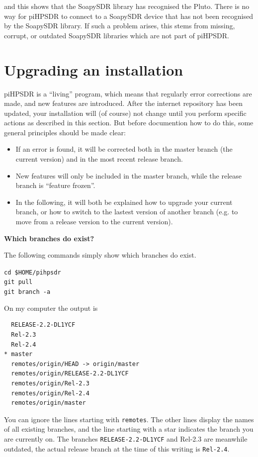 \documentclass[12pt]{book}
\def\grtt#1{\texttt{\color{magenta}#1}}
\def\pH{pi\-HPSDR\xspace}
\begin{document}
and this shows that the SoapySDR library has recognised the Pluto.
There is no way for \pH to connect
to a SoapySDR device that has not been recognised by the SoapySDR library. If such a problem arises, this
stems from missing, corrupt, or outdated SoapySDR libraries which are not part of \pH.

\section{Upgrading an installation}
\pH is a ``living'' program, which means that regularly  error corrections are made, and new features are
introduced. After the internet repository has been updated, your installation will (of course) not change
until you perform specific actions as described in this section. But before documention how to do this,
some general principles should be made clear:

\begin{itemize}
\item{If an error is found, it will be corrected both in the master branch (the current version) and in the
most recent release branch.}
\item{New features will only be included in the master branch, while the release branch is ``feature frozen''.}
\item{In the following, it will both be explained how to upgrade your current branch, or how to
switch to the lastest version of  another branch (e.g. to move from a release version to the current version).}
\end{itemize}

\textbf{Which branches do exist?}

The following commands simply show which branches do exist.

\grtt{cd \$HOME/pihpsdr} \\
\grtt{git pull} \\
\grtt{git branch -a}

On my computer the output is

\begin{verbatim}
  RELEASE-2.2-DL1YCF
  Rel-2.3
  Rel-2.4
* master
  remotes/origin/HEAD -> origin/master
  remotes/origin/RELEASE-2.2-DL1YCF
  remotes/origin/Rel-2.3
  remotes/origin/Rel-2.4
  remotes/origin/master
\end{verbatim}

You can ignore the  lines starting with \texttt{remotes}. The other lines display the names of all
existing branches, and the line starting with a star indicates the branch you are currently on.
The branches \texttt{RELEASE-2.2-DL1YCF} and {Rel-2.3} are meanwhile outdated, the actual release branch
at the time of  this writing is \texttt{Rel-2.4}.
\end{document}
